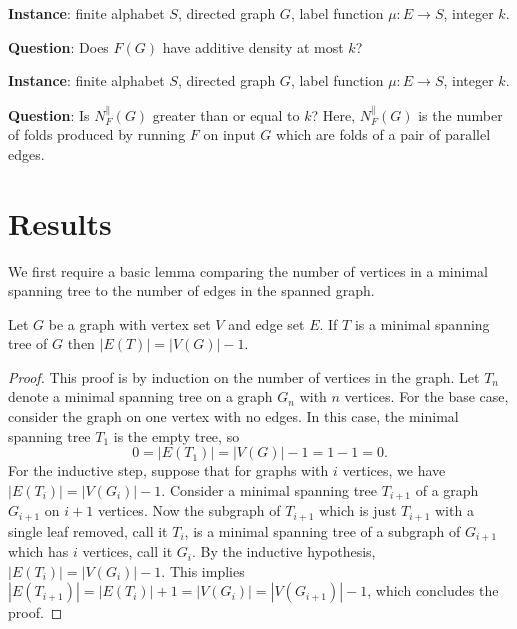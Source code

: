 \documentclass{article}
\newcommand{\FD}{\textsc{Folded Density}}
\newcommand{\PFolds}{\textsc{Parallel Folds}}
\newcommand{\Instance}{\textbf{Instance}: }
\newcommand{\Question}{\textbf{Question}: }
\newcommand{\instanceindent}{%
  \setlength{\leftskip}{2em}%
  \setlength{\parindent}{-2em}}
\newcommand{\questionindent}{%
  \setlength{\leftskip}{2em}%
  \setlength{\parindent}{-2em}}
\begin{document}
\begin{definition}[\FD]
  \mbox{}

  \instanceindent
  \Instance finite alphabet $S$, directed graph $G$, label function $\mu \colon E \to S$, integer $k$.

  \questionindent
  \Question Does $F(G)$ have additive density at most $k$?
\end{definition}

\begin{definition}[\PFolds]
  \mbox{}

  \instanceindent
  \textbf{Instance}: finite alphabet $S$, directed graph $G$, label function $\mu \colon E \to S$, integer $k$.

  \questionindent
  \textbf{Question}: Is $N^\|_F(G)$ greater than or equal to $k$? Here, $N^\|_F(G)$ is the number of folds produced by running $F$ on input $G$ which are folds of a pair of parallel edges.
\end{definition}

\section{Results}

We first require a basic lemma comparing the number of vertices in a minimal spanning tree to the number of edges in the spanned graph.

\begin{lemma}\label{lem:tree}
  Let $G$ be a graph with vertex set $V$ and edge set $E$.
  If $T$ is a minimal spanning tree of $G$ then $|E(T)| = |V(G)| - 1$.
\end{lemma}
\begin{proof}
  This proof is by induction on the number of vertices in the graph.
  Let $T_n$ denote a minimal spanning tree on a graph $G_n$ with $n$ vertices.
  For the base case, consider the graph on one vertex with no edges.
  In this case, the minimal spanning tree $T_1$ is the empty tree, so
  \begin{equation*}
    0 = |E(T_1)| = |V(G)| - 1 = 1 - 1 = 0.
  \end{equation*}
  For the inductive step, suppose that for graphs with $i$ vertices, we have $|E(T_i)| = |V(G_i)| - 1$.
  Consider a minimal spanning tree $T_{i + 1}$ of a graph $G_{i + 1}$ on $i + 1$ vertices.
  Now the subgraph of $T_{i + 1}$ which is just $T_{i + 1}$ with a single leaf removed, call it $T_i$, is a minimal spanning tree of a subgraph of $G_{i + 1}$ which has $i$ vertices, call it $G_i$.
  By the inductive hypothesis, $|E(T_i)| = |V(G_i)| - 1$.
  This implies $|E(T_{i + 1})| = |E(T_i)| + 1 = |V(G_i)| = |V(G_{i + 1})| - 1$, which concludes the proof.
\end{proof}
\end{document}
